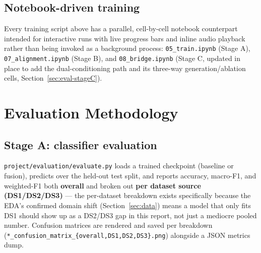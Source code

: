 \documentclass[11pt]{article}
\begin{document}
\subsection{Notebook-driven training}
Every training script above has a parallel, cell-by-cell notebook counterpart intended for
interactive runs with live progress bars and inline audio playback rather than being invoked as a
background process: \texttt{05\_train.ipynb} (Stage A), \texttt{07\_alignment.ipynb} (Stage B), and
\texttt{08\_bridge.ipynb} (Stage C, updated in place to add the dual-conditioning path and its
three-way generation/ablation cells, Section~\ref{sec:eval-stageC}).

\section{Evaluation Methodology}
\label{sec:eval}

\subsection{Stage A: classifier evaluation}
\texttt{project/evaluation/evaluate.py} loads a trained checkpoint (baseline or fusion), predicts
over the held-out test split, and reports accuracy, macro-F1, and weighted-F1 both \textbf{overall}
and broken out \textbf{per dataset source (DS1/DS2/DS3)} --- the per-dataset breakdown exists
specifically because the EDA's confirmed domain shift (Section~\ref{sec:data}) means a model that
only fits DS1 should show up as a DS2/DS3 gap in this report, not just a mediocre pooled number.
Confusion matrices are rendered and saved per breakdown (\texttt{*\_confusion\_matrix\_\{overall,DS1,DS2,DS3\}.png})
alongside a JSON metrics dump.
\end{document}

